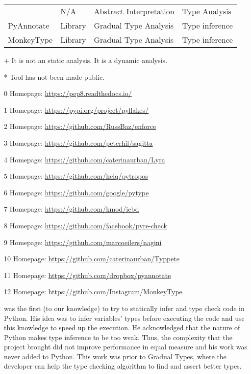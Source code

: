 \begin{sidewaystable}[p]
\begin{threeparttable}
\begin{longtable}[]{|l|l|l|l|}
    \textcite{monat_static_2018}\tnote{*}                & N/A     & Abstract Interpretation & Type Analysis               \tabularnewline
    PyAnnotate\tnote{+}\tnote{11}                        & Library & Gradual Type Analysis   & Type inference              \tabularnewline
    MonkeyType\tnote{+}\tnote{12}                        & Library & Gradual Type Analysis   & Type inference              \tabularnewline
  \bottomrule
\end{longtable}
\begin{tablenotes}
  \item[+] \footnotesize It is not an static analysis. It is a dynamic analysis.
  \item[*] Tool has not been made public.
  \item[0] Homepage: \url{https://pep8.readthedocs.io/}
  \item[1] Homepage: \url{https://pypi.org/project/pyflakes/}
  \item[2] Homepage: \url{https://github.com/RussBaz/enforce}
  \item[3] Homepage: \url{https://github.com/peterhil/sagitta}
  \item[4] Homepage: \url{https://github.com/caterinaurban/Lyra}
  \item[5] Homepage: \url{https://github.com/helq/pytropos}
  \item[6] Homepage: \url{https://github.com/google/pytype}
  \item[7] Homepage: \url{https://github.com/kmod/icbd}
  \item[8] Homepage: \url{https://github.com/facebook/pyre-check}
  \item[9] Homepage: \url{https://github.com/marcoeilers/nagini}
  \item[10] Homepage: \url{https://github.com/caterinaurban/Typpete}
  \item[11] Homepage: \url{https://github.com/dropbox/pyannotate}
  \item[12] Homepage: \url{https://github.com/Instagram/MonkeyType}
\end{tablenotes}
\end{threeparttable}
\end{sidewaystable}

\textcite{cannon_localized_2005} was the first (to our knowledge) to try to statically
infer and type check code in Python. His idea was to infer variables' types before
executing the code and use this knowledge to speed up the execution. He acknowledged that
the nature of Python makes type inference to be too weak. Thus, the complexity that the
project brought did not improve performance in equal measure and his work was never added
to Python. This work was prior to \textcite{siek_gradual_2006} Gradual Types, where the
developer can help the type checking algorithm to find and assert better types.

